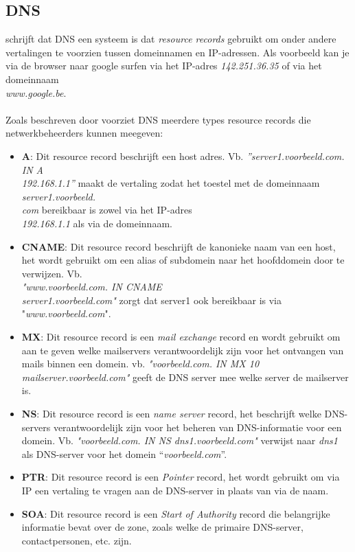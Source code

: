 \documentclass{hogent-article}
\begin{document}
\subsection{DNS}
\textcite{Mockapetris1987} schrijft dat DNS een systeem is dat \textit{resource records} gebruikt om onder andere vertalingen te voorzien tussen domeinnamen en IP-adressen. Als voorbeeld kan je via de browser naar google surfen via het IP-adres \textit{142.251.36.35} of via het domeinnaam\\ \textit{www.google.be}.
\\ \\
Zoals beschreven door \textcite{Mockapetris1987} voorziet DNS meerdere types resource records die netwerkbeheerders kunnen meegeven: 
\begin{itemize}
    \item \textbf{A}: Dit resource record beschrijft een host adres. 
    Vb. \textit{”server1.voorbeeld.com. IN A \\192.168.1.1”} maakt de vertaling zodat het toestel met de domeinnaam \textit{server1.voorbeeld.\\com} bereikbaar is zowel via het IP-adres\\ \textit{192.168.1.1} als via de domeinnaam. 
    \item \textbf{CNAME}: Dit resource record beschrijft de kanonieke naam van een host, het wordt gebruikt om een alias of subdomein naar het hoofddomein door te verwijzen. Vb.\\ \textit{"www.voorbeeld.com. IN CNAME \\server1.voorbeeld.com"} zorgt dat server1 ook bereikbaar is via "\textit{www.voorbeeld.com}".
    \item \textbf{MX}: Dit resource record is een \textit{mail exchange} record en wordt gebruikt om aan te geven welke mailservers verantwoordelijk zijn voor het ontvangen van mails binnen een domein. vb. \textit{"voorbeeld.com. IN MX 10 mailserver.voorbeeld.com"} geeft de DNS server mee welke server de mailserver is.
    \item \textbf{NS}: Dit resource record is een \textit{name server} record, het beschrijft welke DNS-servers verantwoordelijk zijn voor het beheren van DNS-informatie voor een domein. Vb. \textit{"voorbeeld.com. IN NS dns1.voorbeeld.com"} verwijst naar \textit{dns1} als DNS-server voor het domein “\textit{voorbeeld.com}”.
    \item \textbf{PTR}: Dit resource record is een \textit{Pointer} record, het wordt gebruikt om via IP een vertaling te vragen aan de DNS-server in plaats van via de naam.
    \item \textbf{SOA}: Dit resource record is een \textit{Start of Authority} record die belangrijke informatie bevat over de zone, zoals welke de primaire DNS-server, contactpersonen, etc. zijn.
\end{itemize}
\end{document}
